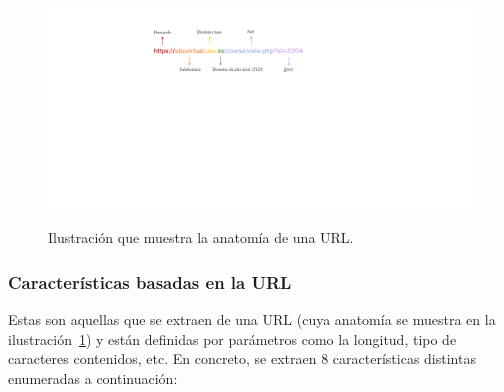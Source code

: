 \begin{figure}[h]
	\caption[\textit{Phishing}: Anatomía de una URL]{Ilustración que muestra la anatomía de una URL.}
	\centering
	\includegraphics[scale=1]{../img/memoria/5_url_anatomia.pdf}
	\label{img:5_url_anatomia}
\end{figure}

\subsubsection{Características basadas en la URL}
Estas son aquellas que se extraen de una URL (cuya anatomía se muestra en la ilustración~\ref{img:5_url_anatomia}) y están definidas por parámetros como la longitud, tipo de caracteres contenidos, etc. En concreto, se extraen 8 características distintas enumeradas a continuación:

